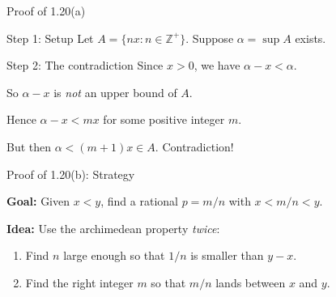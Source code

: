 \documentclass[aspectratio=169,12pt,t]{beamer}
\begin{document}
{%
\begin{frame}{Proof of 1.20(a)}
  \begin{proofblock}{Step 1: Setup}
    Let $A = \{nx : n \in \mathbb{Z}^+\}$.
    Suppose $\alpha = \sup A$ exists.
  \end{proofblock}

  \begin{proofblock}{Step 2: The contradiction}
    Since $x > 0$, we have $\alpha - x < \alpha$.

    \vspace{0.3em}
    So $\alpha - x$ is \emph{not} an upper bound of $A$.

    \vspace{0.3em}
    Hence $\alpha - x < mx$ for some positive integer $m$.

    \vspace{0.3em}
    But then $\alpha < (m+1)x \in A$. \alert{Contradiction!}
  \end{proofblock}

\end{frame}

\begin{frame}{Proof of 1.20(b): Strategy}
  \begin{hlbox}
    \textbf{Goal:} Given $x < y$, find a rational $p = m/n$ with $x < m/n < y$.

    \vspace{1em}
    \textbf{Idea:} Use the archimedean property \emph{twice}:
    \begin{enumerate}
      \item Find $n$ large enough so that $1/n$ is smaller than $y - x$.
      \item Find the right integer $m$ so that $m/n$ lands between $x$ and $y$.
    \end{enumerate}
  \end{hlbox}


\end{frame}}
\end{document}

